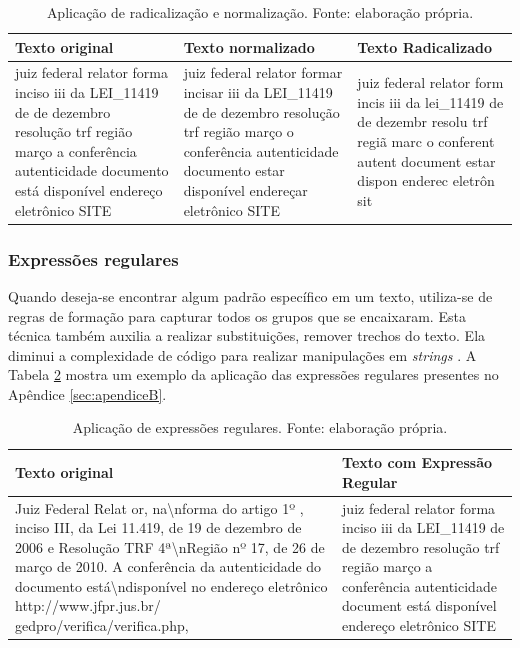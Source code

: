 \begin{table}[h]
	\centering    
	\caption[Aplicação de radicalização e normalização]{Aplicação de radicalização e normalização. Fonte: elaboração própria.}
    \label{tab:radicalizacaoNormalizacao}
	\begin{tabular}{|p{4cm}|p{4cm}|p{4cm}|}
    \hline
    \textbf{Texto original} & \textbf{Texto normalizado} & \textbf{Texto Radicalizado} \\ \hline
	juiz federal relator forma inciso iii da LEI\_11419 de de dezembro resolução trf região março a conferência autenticidade documento está disponível endereço eletrônico SITE & juiz federal relator formar incisar iii da LEI\_11419 de de dezembro resolução trf região março o conferência autenticidade documento estar disponível endereçar eletrônico SITE & juiz federal relator form incis iii da lei\_11419 de de dezembr resolu trf regiã marc o conferent autent document estar dispon enderec eletrôn sit
    \\ \hline
    \end{tabular}
\end{table}

\subsubsection{Expressões regulares}

Quando deseja-se encontrar algum padrão específico em um texto, utiliza-se de regras de formação para capturar todos os grupos que se encaixaram. Esta técnica também  auxilia a realizar substituições, remover trechos do texto. Ela diminui a complexidade de código para realizar manipulações em \textit{strings} \cite{GOYUAERTS2012}. A Tabela \ref{tab:regex} mostra um exemplo da aplicação das expressões regulares presentes no Apêndice \ref{sec:apendiceB}.

\begin{table}[h]
	\centering    
	\caption[Aplicação de expressões regulares]{Aplicação de expressões regulares. Fonte: elaboração própria.}
    \label{tab:regex}
	\begin{tabular}{|p{7cm}|p{7cm}|}
    \hline
    \textbf{Texto original} & \textbf{Texto com Expressão Regular} \\ \hline
	Juiz Federal Relat or, na\textbackslash nforma do artigo 1º , inciso III, da Lei 11.419, de 19 de dezembro de 2006 e Resolução TRF 4ª\textbackslash nRegião nº 17, de 26 de março de 2010. A conferência da autenticidade do documento está\textbackslash ndisponível no endereço eletrônico http://www.jfpr.jus.br/ gedpro/verifica/verifica.php, & juiz federal relator forma inciso iii da LEI\_11419 de de dezembro resolução trf região março a conferência autenticidade document está disponível endereço eletrônico SITE \\ \hline
    \end{tabular}
\end{table}

